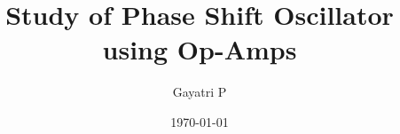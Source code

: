 \documentclass[reprint,amsmath,amssymb,aps]{revtex4-2}
\begin{document}
    \title{Study of Phase Shift Oscillator using Op-Amps}

    \author{Gayatri P}
    \date{\today}

    
    \maketitle

    
    
    
    

    
    \nocite{*}
\end{document}
